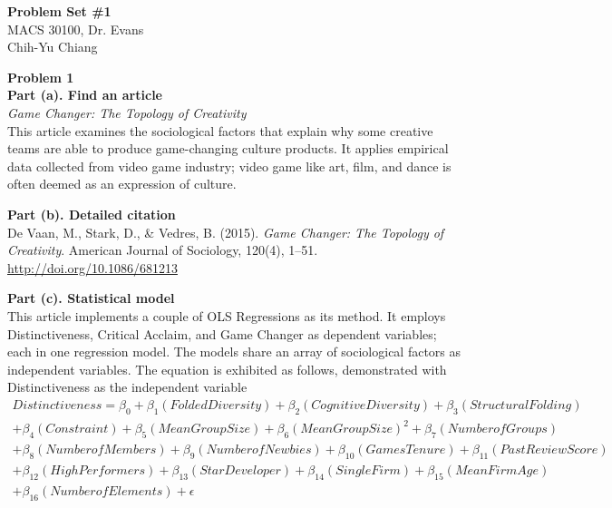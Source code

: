 \documentclass[letterpaper,10pt]{article}
\theoremstyle{definition}
\begin{document}
\begin{flushleft}
  \textbf{\large{Problem Set \#1}} \\
  MACS 30100, Dr. Evans \\
  Chih-Yu Chiang \\
\end{flushleft}

\noindent\textbf{Problem 1} \\
\noindent\textbf{Part (a). Find an article} \\
\textit{Game Changer: The Topology of Creativity} \\
This article examines the sociological factors that explain why some creative teams are able to produce game-changing culture products. It applies empirical data collected from video game industry; video game like art, film, and dance is often deemed as an expression of culture.

\noindent\textbf{Part (b). Detailed citation} \\
De Vaan, M., Stark, D., & Vedres, B. (2015). \textit{Game Changer: The Topology of Creativity}. American Journal of Sociology, 120(4), 1–51. \url{http://doi.org/10.1086/681213}

\noindent\textbf{Part (c). Statistical model} \\
This article implements a couple of OLS Regressions as its method. It employs Distinctiveness, Critical Acclaim, and Game Changer as dependent variables; each in one regression model. The models share an array of sociological factors as independent variables. The equation is exhibited as follows, demonstrated with Distinctiveness as the independent variable
\begin{multline*}
Distinctiveness = \beta_{0} + \beta_{1}(Folded Diversity) + \beta_{2}(Cognitive Diversity) + \beta_{3}(Structural Folding) \\ + \beta_{4}(Constraint) + \beta_{5}(Mean Group Size) + \beta_{6}(Mean Group Size)^{2} + \beta_{7}(Number of Groups) \\ + \beta_{8}(Number of Members) + \beta_{9}(Number of Newbies) + \beta_{10}(Games Tenure) + \beta_{11}(Past Review Score) \\ + \beta_{12}(High Performers) + \beta_{13}(Star Developer) + \beta_{14}(Single Firm) + \beta_{15}(Mean Firm Age) \\ + \beta_{16}(Number of Elements) + \epsilon
\end{multline*}
\end{document}
